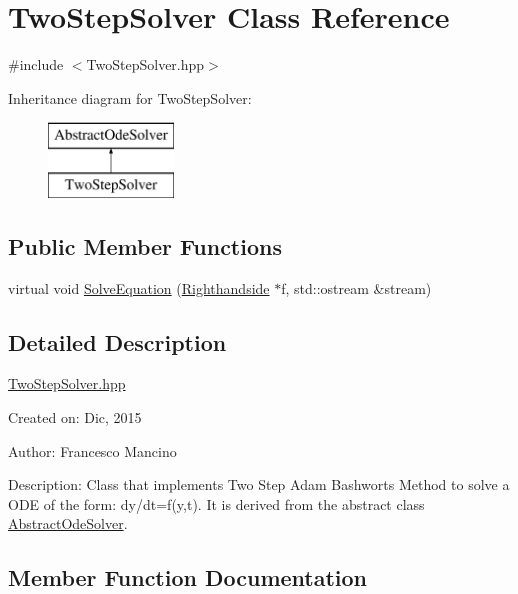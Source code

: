 \hypertarget{class_two_step_solver}{}\section{Two\+Step\+Solver Class Reference}
\label{class_two_step_solver}


{\ttfamily \#include $<$Two\+Step\+Solver.\+hpp$>$}

Inheritance diagram for Two\+Step\+Solver\+:\begin{figure}[H]
\begin{center}
\leavevmode
\includegraphics[height=2.000000cm]{class_two_step_solver}
\end{center}
\end{figure}
\subsection*{Public Member Functions}
\begin{DoxyCompactItemize}
\item 
virtual void \hyperlink{class_two_step_solver_ae52e8c2313e8f9fa617d13b7ed83284e}{Solve\+Equation} (\hyperlink{class_righthandside}{Righthandside} $\ast$f, std\+::ostream \&stream)
\end{DoxyCompactItemize}


\subsection{Detailed Description}
\hyperlink{_two_step_solver_8hpp_source}{Two\+Step\+Solver.\+hpp}

Created on\+: Dic, 2015 \begin{DoxyVerb}Author: Francesco Mancino
\end{DoxyVerb}


Description\+: Class that implements Two Step Adam Bashworts Method to solve a O\+D\+E of the form\+: dy/dt=f(y,t). It is derived from the abstract class \hyperlink{class_abstract_ode_solver}{Abstract\+Ode\+Solver}. 

\subsection{Member Function Documentation}
\hypertarget{class_two_step_solver_ae52e8c2313e8f9fa617d13b7ed83284e}{}
